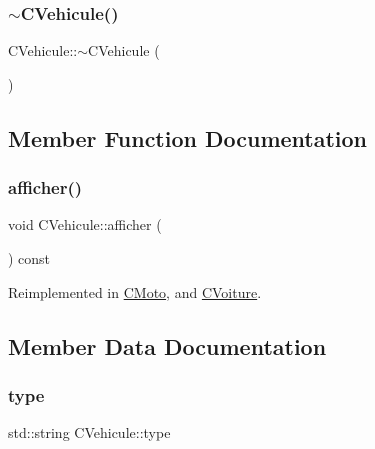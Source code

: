 \mbox{\label{classCVehicule_a149e48f61193e22310c87a418f11fcc3}} 
\subsubsection{\texorpdfstring{$\sim$\+C\+Vehicule()}{~CVehicule()}}
{\footnotesize\ttfamily C\+Vehicule\+::$\sim$\+C\+Vehicule (\begin{DoxyParamCaption}{ }\end{DoxyParamCaption})\hspace{0.3cm}{\ttfamily [virtual]}}



\subsection{Member Function Documentation}
\mbox{\label{classCVehicule_a7d62fa555949feb096b4f56781164895}} 
\subsubsection{\texorpdfstring{afficher()}{afficher()}}
{\footnotesize\ttfamily void C\+Vehicule\+::afficher (\begin{DoxyParamCaption}{ }\end{DoxyParamCaption}) const\hspace{0.3cm}{\ttfamily [virtual]}}



Reimplemented in \hyperlink{classCMoto_a37389934d10714c39386335eb31381e1}{C\+Moto}, and \hyperlink{classCVoiture_a0dd704fa1e172f461950f7f21a7ce21e}{C\+Voiture}.



\subsection{Member Data Documentation}
\mbox{\label{classCVehicule_aade35613ce26b4263d09d39889604022}} 
\subsubsection{\texorpdfstring{type}{type}}
{\footnotesize\ttfamily std\+::string C\+Vehicule\+::type\hspace{0.3cm}{\ttfamily [protected]}}



